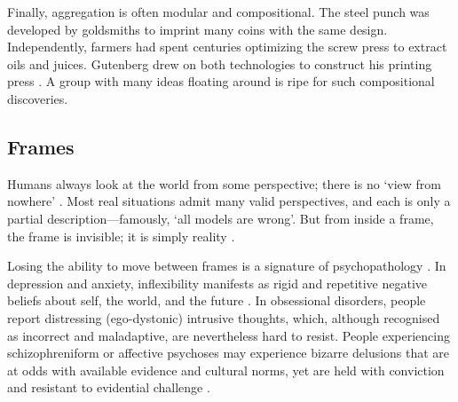 \documentclass[11pt]{article}
\begin{document}
Finally, aggregation is often modular and compositional. The steel punch was developed by goldsmiths to imprint many coins with the same design. Independently, farmers had spent centuries optimizing the screw press to extract oils and juices. Gutenberg drew on both technologies to construct his printing press \citep{johnson2010where}. A group with many ideas floating around is ripe for such compositional discoveries.










\subsection{Frames} 

Humans always look at the world from some perspective; there is no `view from nowhere' \citep{nagel1986view}. Most real situations admit many valid perspectives, and each is only a partial description---famously, `all models are wrong'. But from inside a frame, the frame is invisible; it is simply reality \citep{goffman1974frame, berger1966social, kuhn1970structure, wittgenstein1953philosophical}. 

Losing the ability to move between frames is a signature of psychopathology \citep{kashdan2010psychological}. In depression and anxiety, inflexibility manifests as rigid and repetitive negative beliefs about self, the world, and the future \citep{beck2011cognitive}. In obsessional disorders, people report distressing (ego-dystonic) intrusive thoughts, which, although recognised as incorrect and maladaptive, are nevertheless hard to resist. People experiencing schizophreniform or affective psychoses may experience bizarre delusions that are at odds with available evidence and cultural norms, yet are held with conviction and resistant to evidential challenge \citep{adams2013computational}. 
\end{document}
